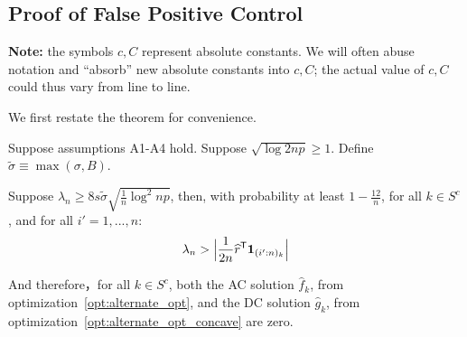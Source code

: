  
 
 
 
 
 \subsection{Proof of False Positive Control}
 \label{sec:false_positive_proof}
 
\textbf{Note:} the symbols $c,C$ represent absolute constants. We will often abuse notation and ``absorb'' new absolute constants into $c, C$; the actual value of $c, C$ could thus vary from line to line.

 We first restate the theorem for convenience. 
 

\begin{theorem} 
Suppose assumptions A1-A4 hold. Suppose $\sqrt{\log 2np} \geq 1$. Define $\tilde{\sigma} \equiv \max(\sigma, B)$.

Suppose $\lambda_n \geq 8 s \tilde{\sigma}  \sqrt{ \frac{1}{n} \log^2 np}$, then, with probability at least $ 1 - \frac{12}{n}$, for all $k \in S^c$, and for all $i'=1,...,n$:
\[
\lambda_n > \Big| \frac{1}{2n}\widehat{r}^{\mathsf{T}} \mbox{\boldmath $1$}_{(i':n)_k} \Big|
\]

And therefore，for all $k \in S^c$, both the AC solution $\hat{f}_k$, from optimization~\ref{opt:alternate_opt}, and the DC solution $\hat{g}_k$, from optimization~\ref{opt:alternate_opt_concave} are zero. 
\end{theorem}

